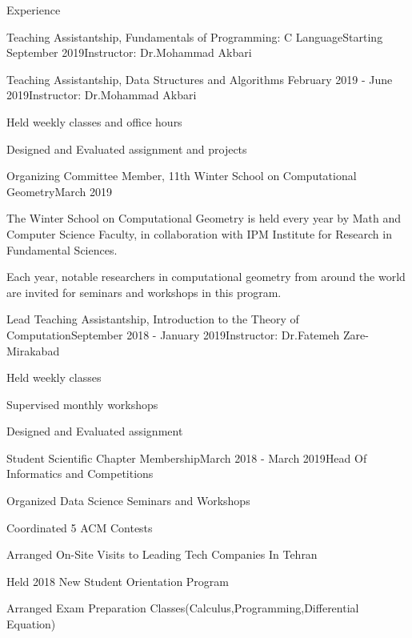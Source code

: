 \documentclass{resume} %
\begin{document}
	\begin{rSection}{Experience}
		\begin{rSubsection}{Teaching Assistantship, Fundamentals of Programming: C Language}{Starting September 2019}{Instructor: Dr.Mohammad Akbari}{ }

		\end{rSubsection}
	
		\begin{rSubsection}{Teaching Assistantship, Data Structures and Algorithms }{February 2019 - June 2019}{Instructor: Dr.Mohammad Akbari}{ }
			\item 
			Held weekly classes and office hours
			\item 
			Designed and Evaluated assignment and projects
		\end{rSubsection}
		\begin{rSubsection}{Organizing Committee Member, 11th Winter School on Computational Geometry}{March 2019}{}{ }
			\item 	The Winter School on Computational Geometry is held every year by Math and Computer Science Faculty, in collaboration with IPM Institute for Research in Fundamental Sciences.
			\item Each year, notable researchers in computational geometry from around the world are invited for seminars and workshops in this program.
		\end{rSubsection}
		
		
		
		\begin{rSubsection}{Lead Teaching Assistantship, Introduction to the Theory of Computation}{September 2018 - January 2019}{Instructor: Dr.Fatemeh Zare-Mirakabad}{ }
			\item Held weekly classes 
			\item Supervised monthly workshops
			\item Designed and Evaluated assignment 
			
		\end{rSubsection}
		
		
		\begin{rSubsection}{Student Scientific Chapter Membership}{March 2018 - March 2019}{Head Of Informatics and Competitions}{ }
			\item Organized Data Science Seminars and Workshops
			\item Coordinated 5 ACM Contests
			\item Arranged On-Site Visits to Leading Tech Companies In Tehran
			\item Held 2018 New Student Orientation Program 
			\item Arranged Exam Preparation Classes(Calculus,Programming,Differential Equation)
		\end{rSubsection}
		
		
	\end{rSection}
	
\end{document}
